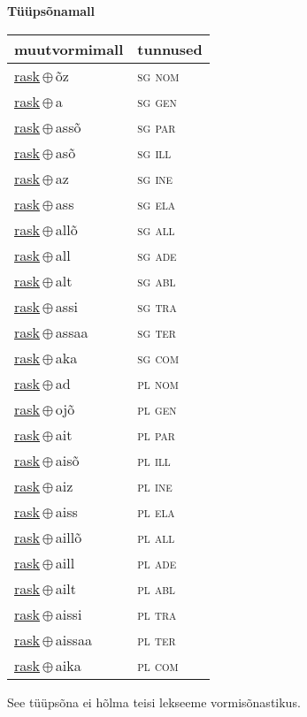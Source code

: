 

\vspace{3.5em}
\noindent \begin{minipage}{\textwidth}
\noindent \textbf{Tüüpsõnamall \,}\\

\begin{sideways}
\begin{tabular}{l l}
muutvormimall & tunnused \\
\hline
\underline{rask}\,$\oplus$\,õz & \textsc{ sg nom } \\
\underline{rask}\,$\oplus$\,a & \textsc{ sg gen } \\
\underline{rask}\,$\oplus$\,assõ & \textsc{ sg par } \\
\underline{rask}\,$\oplus$\,asõ & \textsc{ sg ill } \\
\underline{rask}\,$\oplus$\,az & \textsc{ sg ine } \\
\underline{rask}\,$\oplus$\,ass & \textsc{ sg ela } \\
\underline{rask}\,$\oplus$\,allõ & \textsc{ sg all } \\
\underline{rask}\,$\oplus$\,all & \textsc{ sg ade } \\
\underline{rask}\,$\oplus$\,alt & \textsc{ sg abl } \\
\underline{rask}\,$\oplus$\,assi & \textsc{ sg tra } \\
\underline{rask}\,$\oplus$\,assaa & \textsc{ sg ter } \\
\underline{rask}\,$\oplus$\,aka & \textsc{ sg com } \\
\underline{rask}\,$\oplus$\,ad & \textsc{ pl nom } \\
\underline{rask}\,$\oplus$\,ojõ & \textsc{ pl gen } \\
\underline{rask}\,$\oplus$\,ait & \textsc{ pl par } \\
\underline{rask}\,$\oplus$\,aisõ & \textsc{ pl ill } \\
\underline{rask}\,$\oplus$\,aiz & \textsc{ pl ine } \\
\underline{rask}\,$\oplus$\,aiss & \textsc{ pl ela } \\
\underline{rask}\,$\oplus$\,aillõ & \textsc{ pl all } \\
\underline{rask}\,$\oplus$\,aill & \textsc{ pl ade } \\
\underline{rask}\,$\oplus$\,ailt & \textsc{ pl abl } \\
\underline{rask}\,$\oplus$\,aissi & \textsc{ pl tra } \\
\underline{rask}\,$\oplus$\,aissaa & \textsc{ pl ter } \\
\underline{rask}\,$\oplus$\,aika & \textsc{ pl com } \\
\end{tabular}
\end{sideways}
\label{tab:tüüpsõnamall-raskõz}

\end{minipage}

 
\vspace{1em}
\noindent See tüüpsõna ei hõlma teisi lekseeme vormi\-sõnastikus.
